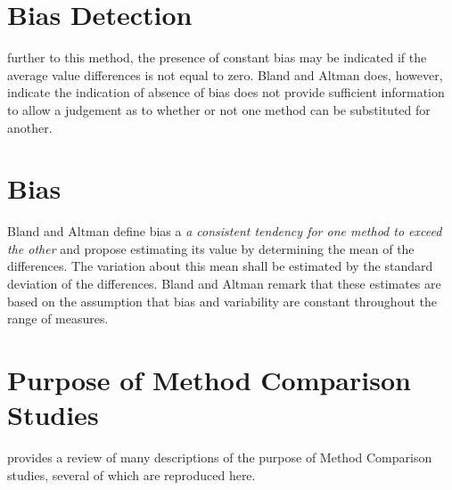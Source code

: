 \documentclass[12pt, a4paper]{report}
\theoremstyle{plain}
\theoremstyle{definition}
\theoremstyle{remark}
\begin{document}
	\section{Bias Detection}
	further to this method, the presence of constant bias may be
	indicated if the average value differences is not equal to zero.
	Bland and Altman does, however, indicate the indication of absence
	of bias does not provide sufficient information to allow a
	judgement as to whether or not one method can be substituted for
	another.
	\section{Bias}
	Bland and Altman define bias a \emph{a consistent tendency for one
		method to exceed the other} and propose estimating its value
	by determining the mean of the differences. The variation about
	this mean shall be estimated by the  standard deviation of the
	differences. Bland and Altman remark that these estimates are based on the
	assumption that bias and variability are constant throughout the
	range of measures.
	
	
	
	
	\section{Purpose of Method Comparison Studies}
	\citet{BXC2010} provides a review of many descriptions of the purpose of Method Comparison studies, several of which are reproduced here.
	
\end{document}
